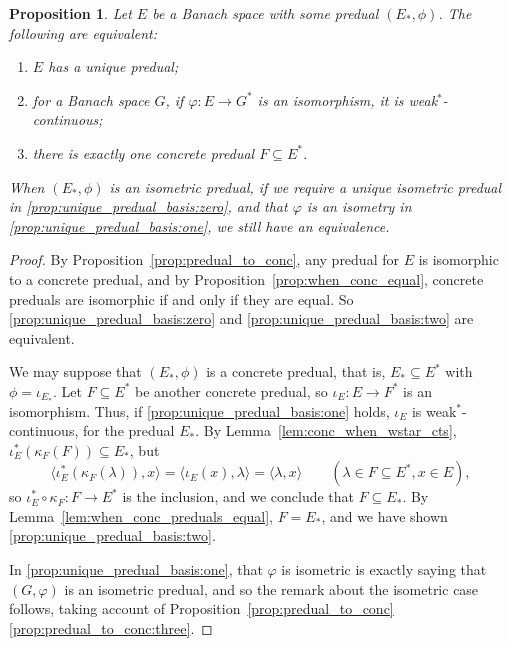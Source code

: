 \documentclass[a4paper,11pt]{article}
\theoremstyle{plain}
\newtheorem{proposition}{Proposition}[section]
\theoremstyle{remark}
\newcommand{\ip}[2]{{\langle {#1} , {#2} \rangle}}
\begin{document}
\begin{proposition}\label{prop:unique_predual_basis}
Let $E$ be a Banach space with some predual $(E_*, \phi)$.  The following are equivalent:
\begin{enumerate}[(1)]
  \item\label{prop:unique_predual_basis:zero}
  $E$ has a unique predual;
  \item\label{prop:unique_predual_basis:one}
  for a Banach space $G$, if $\varphi \colon E \to G^*$ is an isomorphism, it is weak$^*$-continuous;
  \item\label{prop:unique_predual_basis:two}
  there is exactly one concrete predual $F \subseteq E^*$.
\end{enumerate}
When $(E_*, \phi)$ is an isometric predual, if we require a unique isometric predual in \ref{prop:unique_predual_basis:zero}, and that $\varphi$ is an isometry in \ref{prop:unique_predual_basis:one}, we still have an equivalence.
\end{proposition}
\begin{proof}
By Proposition~\ref{prop:predual_to_conc}, any predual for $E$ is isomorphic to a concrete predual, and by Proposition~\ref{prop:when_conc_equal}, concrete preduals are isomorphic if and only if they are equal.  So \ref{prop:unique_predual_basis:zero} and \ref{prop:unique_predual_basis:two} are equivalent.

We may suppose that $(E_*,\phi)$ is a concrete predual, that is, $E_* \subseteq E^*$ with $\phi = \iota_{E_*}$.  Let $F \subseteq E^*$ be another concrete predual, so $\iota_E \colon E \to F^*$ is an isomorphism.  Thus, if \ref{prop:unique_predual_basis:one} holds, $\iota_E$ is weak$^*$-continuous, for the predual $E_*$.  By Lemma~\ref{lem:conc_when_wstar_cts}, $\iota_E^*(\kappa_F(F)) \subseteq E_*$, but
\[ \ip{\iota_E^*(\kappa_F(\lambda))}{x} = \ip{\iota_E(x)}{\lambda} = \ip{\lambda}{x} \qquad (\lambda\in F\subseteq E^*, x\in E), \]
so $\iota_E^* \circ \kappa_F \colon F \to E^*$ is the inclusion, and we conclude that $F \subseteq E_*$.  By Lemma~\ref{lem:when_conc_preduals_equal}, $F = E_*$, and we have shown \ref{prop:unique_predual_basis:two}.

In \ref{prop:unique_predual_basis:one}, that $\varphi$ is isometric is exactly saying that $(G, \varphi)$ is an isometric predual, and so the remark about the isometric case follows, taking account of Proposition~\ref{prop:predual_to_conc}\ref{prop:predual_to_conc:three}.
\end{proof}
\end{document}
